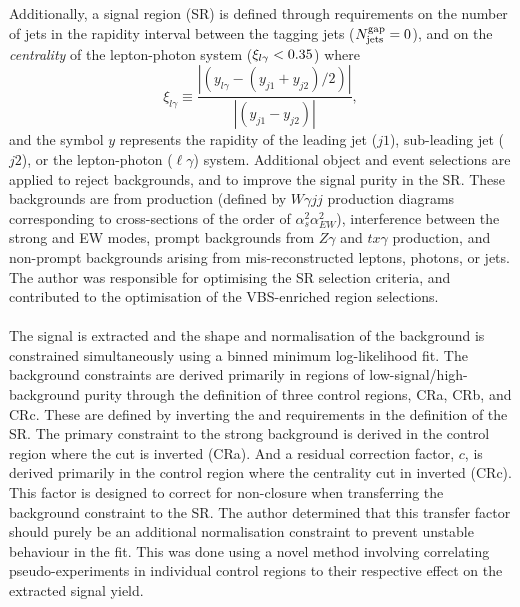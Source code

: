 \documentclass{thesissummary}
\begin{document}
Additionally, a signal region (SR) is defined through requirements on the number of jets in the rapidity interval between the tagging jets ($N^{\text{gap}}_{\text{jets}}=0$), and on the \textit{centrality} of the lepton-photon system ($\xi_{l\gamma}<0.35$)
where 
\begin{equation} 
    \xi_{l\gamma}\equiv\frac{|(y_{l\gamma}-(y_{j1}+y_{j2})/2)|}{|(y_{j1}-y_{j2})|},
\end{equation}
and the symbol $y$ represents the rapidity of the leading jet ($j1$), sub-leading jet ($j2$), or the lepton-photon ($\ell\gamma$) system.
Additional object and event selections are applied to reject backgrounds, and to improve the signal purity in the SR. These backgrounds are from \qcdwy production (defined by $W\gamma jj$ production diagrams corresponding to cross-sections of the order of $\alpha_s^2\alpha_{EW}^2$), interference between the strong and EW \wyjj modes, prompt backgrounds from $Z\gamma$ and $tx\gamma$ production, and non-prompt backgrounds arising from mis-reconstructed leptons, photons, or jets. The author was responsible for optimising the SR selection criteria, and contributed to the optimisation of the VBS-enriched region selections.
\\\\
The signal is extracted and the shape and normalisation of the background is constrained simultaneously using a binned minimum log-likelihood fit. The background constraints are derived primarily in regions of low-signal/high-background purity through the definition of three control regions, CRa, CRb, and CRc. These are defined by inverting the \xily and \ngapjet requirements in the definition of the SR. The primary constraint to the strong background is derived in the control region where the \ngapjet cut is inverted (CRa). And a residual correction factor, $c$, is derived primarily in the control region where the centrality cut in inverted (CRc). This factor is designed to correct for non-closure when transferring the background constraint to the SR. The author determined that this transfer factor should purely be an additional normalisation constraint to prevent unstable behaviour in the fit. This was done using a novel method involving correlating pseudo-experiments in individual control regions to their respective effect on the extracted signal yield.
\\\\
\end{document}
